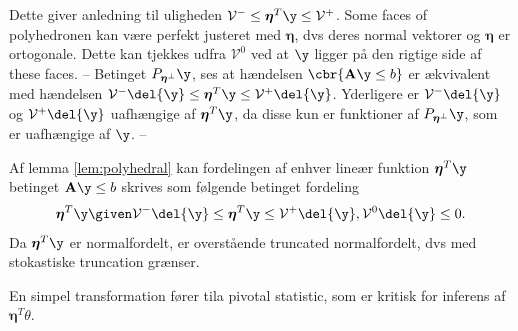 Dette giver anledning til uligheden \(\mathcal{V}^- \leq \boldsymbol{\eta}^T \y \leq \mathcal{V}^+\).
Some faces of polyhedronen kan være perfekt justeret med \(\boldsymbol{\eta}\), dvs deres normal vektorer og \(\boldsymbol{\eta}\) er ortogonale.
Dette kan tjekkes udfra \(\mathcal{V}^0\) ved at \(\y\) ligger på den rigtige side af these faces.  
--
Betinget \(P_{\boldsymbol{\eta}^\perp} \y\), ses at hændelsen \(\cbr{\mathbf{A} \y \leq b}\) er ækvivalent med hændelsen \(\mathcal{V}^- \del{\y} \leq \boldsymbol{\eta}^T \y \leq \mathcal{V}^+ \del{\y}\). Yderligere er \(\mathcal{V}^- \del{\y}\) og \(\mathcal{V}^+ \del{\y}\) uafhængige af \(\boldsymbol{\eta}^T \y\), da disse kun er funktioner af \(P_{\boldsymbol{\eta}^\perp} \y\), som er uafhængige af \(\y\).
--

Af lemma \ref{lem:polyhedral} kan fordelingen af enhver lineær funktion \(\boldsymbol{\eta}^T \y\) betinget \(\mathbf{A} \y \leq b\) skrives som følgende betinget fordeling
\begin{align*}
\boldsymbol{\eta}^T \y \given \mathcal{V}^- \del{\y} \leq \boldsymbol{\eta}^T \y \leq \mathcal{V}^+ \del{\y}, \mathcal{V}^0 \del{\y} \leq 0.
\end{align*}
Da \(\boldsymbol{\eta}^T \y\) er normalfordelt, er overstående truncated normalfordelt, dvs med stokastiske truncation grænser.

En simpel transformation fører tila pivotal statistic, som er kritisk for inferens af \(\boldsymbol{\eta}^T \theta\).

